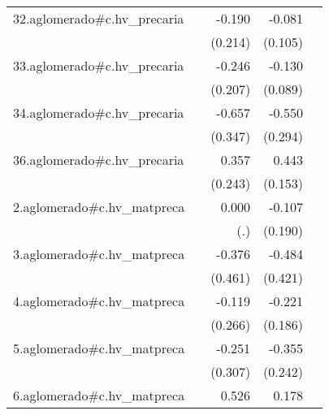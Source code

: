{\begin{longtable}{l*{4}{D{.}{.}{-1}}}
\addlinespace
32.aglomerado#c.hv\_precaria&                     &      -0.190         &      -0.081         &                     \\
            &                     &     (0.214)         &     (0.105)         &                     \\
\addlinespace
33.aglomerado#c.hv\_precaria&                     &      -0.246         &      -0.130         &                     \\
            &                     &     (0.207)         &     (0.089)         &                     \\
\addlinespace
34.aglomerado#c.hv\_precaria&                     &      -0.657         &      -0.550         &                     \\
            &                     &     (0.347)         &     (0.294)         &                     \\
\addlinespace
36.aglomerado#c.hv\_precaria&                     &       0.357         &       0.443\sym{**} &                     \\
            &                     &     (0.243)         &     (0.153)         &                     \\
\addlinespace
2.aglomerado#c.hv\_matpreca&                     &       0.000         &      -0.107         &                     \\
            &                     &         (.)         &     (0.190)         &                     \\
\addlinespace
3.aglomerado#c.hv\_matpreca&                     &      -0.376         &      -0.484         &                     \\
            &                     &     (0.461)         &     (0.421)         &                     \\
\addlinespace
4.aglomerado#c.hv\_matpreca&                     &      -0.119         &      -0.221         &                     \\
            &                     &     (0.266)         &     (0.186)         &                     \\
\addlinespace
5.aglomerado#c.hv\_matpreca&                     &      -0.251         &      -0.355         &                     \\
            &                     &     (0.307)         &     (0.242)         &                     \\
\addlinespace
6.aglomerado#c.hv\_matpreca&                     &       0.526         &       0.178         &                     \\

\end{longtable}}
